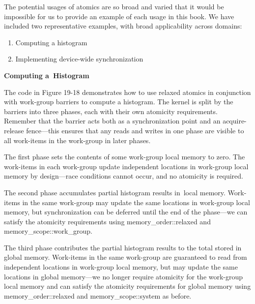 The potential usages of atomics are so broad and varied that it would be impossible for us to provide an example of each usage in this book. We have included two representative examples, with broad applicability across domains:\par
\begin{center}
	
\begin{enumerate}
	\item Computing a histogram
	\item Implementing device-wide synchronization
\end{enumerate}

\end{center}
\hspace*{\fill} \par %
\textbf{Computing a Histogram}

The code in Figure 19-18 demonstrates how to use relaxed atomics in conjunction with work-group barriers to compute a histogram. The kernel is split by the barriers into three phases, each with their own atomicity requirements. Remember that the barrier acts both as a synchronization point and an acquire-release fence—this ensures that any reads and writes in one phase are visible to all work-items in the work-group in later phases.\par

The first phase sets the contents of some work-group local memory to zero. The work-items in each work-group update independent locations in work-group local memory by design—race conditions cannot occur, and no atomicity is required.\par

The second phase accumulates partial histogram results in local memory. Work-items in the same work-group may update the same locations in work-group local memory, but synchronization can be deferred until the end of the phase—we can satisfy the atomicity requirements using memory\_order::relaxed and memory\_scope::work\_group.\par

The third phase contributes the partial histogram results to the total stored in global memory. Work-items in the same work-group are guaranteed to read from independent locations in work-group local memory, but may update the same locations in global memory—we no longer require atomicity for the work-group local memory and can satisfy the atomicity requirements for global memory using memory\_order::relaxed and memory\_scope::system as before.\par

